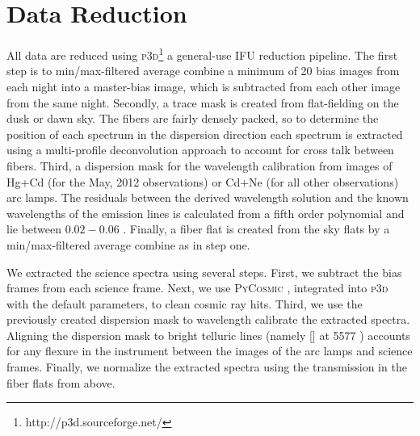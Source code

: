 \section{Data Reduction}\label{2sec:data reduction} 
All data are reduced using \textsc{p3d}\footnote{http://p3d.sourceforge.net/} \citep{Sandin2010} a general-use IFU reduction pipeline. The first step is to min/max-filtered average combine a minimum of 20 bias images from each night into a master-bias image, which is subtracted from each other image from the same night. Secondly, a trace mask is created from flat-fielding on the dusk or dawn sky. The fibers are fairly densely packed, so to determine the position of each spectrum in the dispersion direction each spectrum is extracted using a multi-profile deconvolution approach \citep{Sharp2010} to account for cross talk between fibers. Third, a dispersion mask for the wavelength calibration from images of Hg+Cd (for the May, 2012 observations) or Cd+Ne (for all other observations) arc lamps. The residuals between the derived wavelength solution and the known wavelengths of the emission lines is calculated from a fifth order polynomial and lie between $0.02 - 0.06$ \AAA. Finally, a fiber flat is created from the sky flats by a min/max-filtered average combine as in step one. 

We extracted the science spectra using several steps. First, we subtract the bias frames from each science frame. Next, we use \textsc{PyCosmic} \citep{Husemann2012}, integrated into \textsc{p3d} with the default parameters, to clean cosmic ray hits. Third, we use the previously created dispersion mask to wavelength calibrate the extracted spectra. Aligning the dispersion mask to bright telluric lines (namely \hbox{[]} at 5577 \AAA) accounts for any flexure in the instrument between the images of the arc lamps and science frames. Finally, we normalize the extracted spectra using the transmission in the fiber flats from above. 

